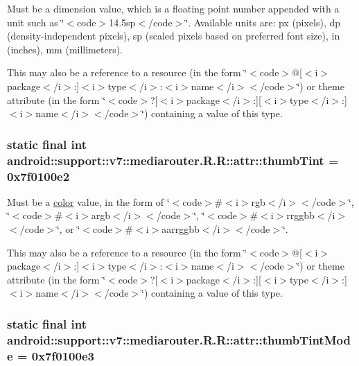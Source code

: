 Must be a dimension value, which is a floating point number appended with a unit such as \char`\"{}$<$code$>$14.5sp$<$/code$>$\char`\"{}. Available units are: px (pixels), dp (density-independent pixels), sp (scaled pixels based on preferred font size), in (inches), mm (millimeters). 

This may also be a reference to a resource (in the form \char`\"{}$<$code$>$@\mbox{[}$<$i$>$package$<$/i$>$:\mbox{]}$<$i$>$type$<$/i$>$:$<$i$>$name$<$/i$>$$<$/code$>$\char`\"{}) or theme attribute (in the form \char`\"{}$<$code$>$?\mbox{[}$<$i$>$package$<$/i$>$:\mbox{]}\mbox{[}$<$i$>$type$<$/i$>$:\mbox{]}$<$i$>$name$<$/i$>$$<$/code$>$\char`\"{}) containing a value of this type. \hypertarget{classandroid_1_1support_1_1v7_1_1mediarouter_1_1_r_1_1attr_65074c0fda663818e7534f723c9dda29}{
\subsubsection[{thumbTint}]{\setlength{\rightskip}{0pt plus 5cm}static final int android::support::v7::mediarouter.R.R::attr::thumbTint = 0x7f0100e2}}
\label{classandroid_1_1support_1_1v7_1_1mediarouter_1_1_r_1_1attr_65074c0fda663818e7534f723c9dda29}


Must be a \hyperlink{classandroid_1_1support_1_1v7_1_1mediarouter_1_1_r_1_1color}{color} value, in the form of \char`\"{}$<$code$>$\#$<$i$>$rgb$<$/i$>$$<$/code$>$\char`\"{}, \char`\"{}$<$code$>$\#$<$i$>$argb$<$/i$>$$<$/code$>$\char`\"{}, \char`\"{}$<$code$>$\#$<$i$>$rrggbb$<$/i$>$$<$/code$>$\char`\"{}, or \char`\"{}$<$code$>$\#$<$i$>$aarrggbb$<$/i$>$$<$/code$>$\char`\"{}. 

This may also be a reference to a resource (in the form \char`\"{}$<$code$>$@\mbox{[}$<$i$>$package$<$/i$>$:\mbox{]}$<$i$>$type$<$/i$>$:$<$i$>$name$<$/i$>$$<$/code$>$\char`\"{}) or theme attribute (in the form \char`\"{}$<$code$>$?\mbox{[}$<$i$>$package$<$/i$>$:\mbox{]}\mbox{[}$<$i$>$type$<$/i$>$:\mbox{]}$<$i$>$name$<$/i$>$$<$/code$>$\char`\"{}) containing a value of this type. \hypertarget{classandroid_1_1support_1_1v7_1_1mediarouter_1_1_r_1_1attr_479369ec52944585c06c87e4d3517134}{
\subsubsection[{thumbTintMode}]{\setlength{\rightskip}{0pt plus 5cm}static final int android::support::v7::mediarouter.R.R::attr::thumbTintMode = 0x7f0100e3}}
\label{classandroid_1_1support_1_1v7_1_1mediarouter_1_1_r_1_1attr_479369ec52944585c06c87e4d3517134}


